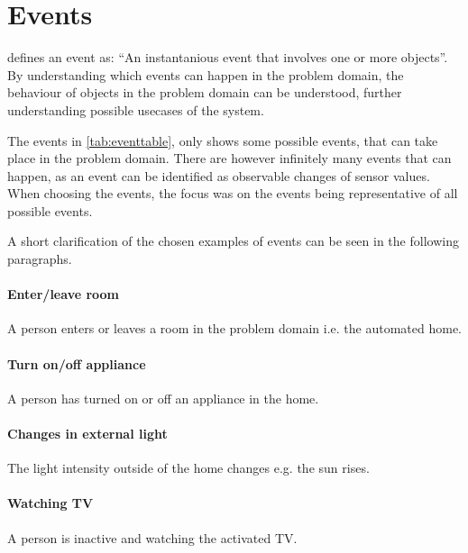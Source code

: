 \section{Events}\label{sec:events}

\citet{OOAD} defines an event as: \enquote{An instantanious event that involves one or more objects}. By understanding which events can happen in the problem domain, the behaviour of objects in the problem domain can be understood, further understanding possible usecases of the system.

The events in \cref{tab:eventtable}, only shows some possible events, that can take place in the problem domain. There are however infinitely many events that can happen, as an event can be identified as observable changes of sensor values. When choosing the events, the focus was on the events being representative of all possible events.

A short clarification of the chosen examples of events can be seen in the following paragraphs.

\paragraph{Enter/leave room} A person enters or leaves a room in the problem domain i.e. the automated home.
\paragraph{Turn on/off appliance} A person has turned on or off an appliance in the home.
\paragraph{Changes in external light} The light intensity outside of the home changes e.g. the sun rises.
\paragraph{Watching TV} A person is inactive and watching the activated TV.

